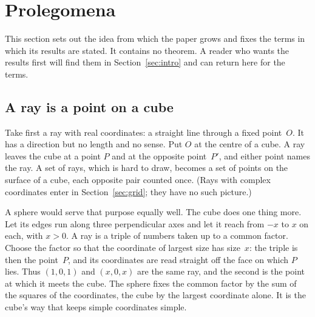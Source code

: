 
\section{Prolegomena}\label{sec:prolegomena}

This section sets out the idea from which the paper grows and fixes the terms in which its
results are stated.  It contains no theorem.  A reader who wants the results first will find
them in Section~\ref{sec:intro} and can return here for the terms.

\subsection{A ray is a point on a cube}

Take first a ray with real coordinates: a straight line through a fixed point~$O$.  It has a
direction but no length and no sense.  Put $O$ at the centre of a cube.  A ray leaves the cube
at a point $P$ and at the opposite point~$P'$, and either point names the ray.  A set of rays,
which is hard to draw, becomes a set of points on the surface of a cube, each opposite pair
counted once.  (Rays with complex coordinates enter in Section~\ref{sec:grid}; they have no
such picture.)

A sphere would serve that purpose equally well.  The cube does one thing more.  Let its edges
run along three perpendicular axes and let it reach from $-x$ to $x$ on each, with $x>0$.  A
ray is a triple of numbers taken up to a common factor.  Choose the factor so that the
coordinate of largest size has size~$x$: the triple is then the point~$P$, and its coordinates
are read straight off the face on which $P$ lies.  Thus $(1,0,1)$ and $(x,0,x)$ are the same
ray, and the second is the point at which it meets the cube.  The sphere fixes the common
factor by the sum of the squares of the coordinates, the cube by the largest coordinate alone.
It is the cube's way that keeps simple coordinates simple.

